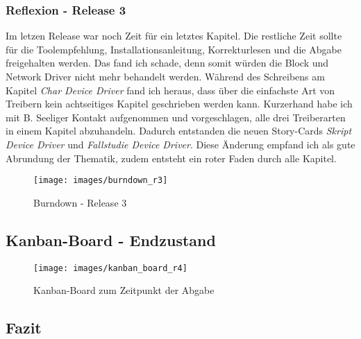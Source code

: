 \subsubsection{Reflexion - Release 3}

Im letzen Release war noch Zeit für ein letztes Kapitel. Die restliche Zeit sollte für die Toolempfehlung, Installationsanleitung, Korrekturlesen und die Abgabe freigehalten werden. Das fand ich
schade, denn somit würden die Block und Network Driver nicht mehr behandelt werden. Während des Schreibens am Kapitel \emph{Char Device Driver} fand ich heraus, dass über die einfachste
Art von Treibern kein achtseitiges Kapitel geschrieben werden kann. Kurzerhand habe ich mit B. Seeliger Kontakt aufgenommen und vorgeschlagen, alle drei Treiberarten in einem Kapitel abzuhandeln.
Dadurch entstanden die neuen Story-Cards \emph{Skript Device Driver} und \emph{Fallstudie Device Driver}. Diese Änderung empfand ich als gute Abrundung der Thematik, zudem entsteht ein roter
Faden durch alle Kapitel. \\

\begin{figure}[h!]
   \begin{center}
      \texttt{[image: images/burndown\_r3]}
   \end{center}
   \caption{Burndown - Release 3}
\end{figure}

\begin{landscape}


\subsection{Kanban-Board - Endzustand}

\begin{figure}[h!]
	\begin{center}
		\texttt{[image: images/kanban\_board\_r4]}
	\end{center}
   \caption[Kanban-Board - Endzustand]{Kanban-Board zum Zeitpunkt der Abgabe}
   \label{fig:kanban_r4}
\end{figure}







\end{landscape}
\restoregeometry


\subsection{Fazit}

